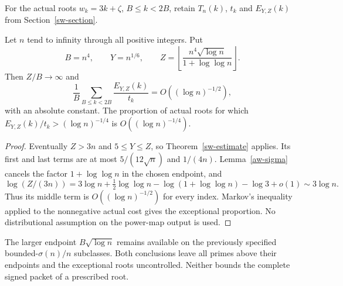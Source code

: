For the actual roots $w_k=3k+\zeta$, $B\le k<2B$, retain $T_n(k)$,
$t_k$ and $E_{Y,Z}(k)$ from Section~\ref{sw-section}.
\begin{theorem}
\label{aw-window}
Let $n$ tend to infinity through all positive integers. Put
\[
 B=n^4,\qquad Y=n^{1/6},\qquad
 Z=\left\lfloor\frac{n^4\sqrt{\log n}}{1+\log\log n}\right\rfloor.
\]
Then $Z/B\to\infty$ and
\[
 \frac1B\sum_{B\le k<2B}\frac{E_{Y,Z}(k)}{t_k}
       =O((\log n)^{-1/2}),
\]
with an absolute constant. The proportion of actual roots for which
$E_{Y,Z}(k)/t_k>(\log n)^{-1/4}$ is $O((\log n)^{-1/4})$.
\end{theorem}
\begin{proof}
Eventually $Z>3n$ and $5\le Y\le Z$, so Theorem~\ref{sw-estimate}
applies. Its first and last terms are at most $5/(12\sqrt n)$ and
$1/(4n)$. Lemma~\ref{aw-sigma} cancels the factor
$1+\log\log n$ in the chosen endpoint, and
\[
 \log(Z/(3n))=3\log n+\tfrac12\log\log n
    -\log(1+\log\log n)-\log3+o(1)\sim3\log n.
\]
Thus its middle term is $O((\log n)^{-1/2})$ for every index.
Markov's inequality applied to the nonnegative actual cost gives the
exceptional proportion. No distributional assumption on the power-map
output is used.
\end{proof}

The larger endpoint $B\sqrt{\log n}$ remains available on the previously
specified bounded-$\sigma(n)/n$ subclasses. Both conclusions leave all
primes above their endpoints and the exceptional roots uncontrolled.
Neither bounds the complete signed packet of a prescribed root.
